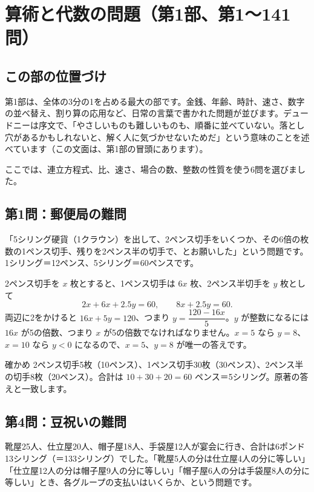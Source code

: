 \documentclass[a4paper,11pt,openany]{ltjsbook}
\begin{document}
\chapter{算術と代数の問題（第1部、第1〜141問）}

\section{この部の位置づけ}

第1部は、全体の3分の1を占める最大の部です。金銭、年齢、時計、速さ、数字の並べ替え、割り算の応用など、日常の言葉で書かれた問題が並びます。デュードニーは序文で、「やさしいものも難しいものも、順番に並べていない。落とし穴があるかもしれないと、解く人に気づかせないためだ」という意味のことを述べています（この文面は、第1部の冒頭にあります）。

ここでは、連立方程式、比、速さ、場合の数、整数の性質を使う6問を選びました。

\section{第1問：郵便局の難問}

「5シリング硬貨（1クラウン）を出して、2ペンス切手をいくつか、その6倍の枚数の1ペンス切手、残りを2ペンス半の切手で、とお願いした」という問題です。1シリング＝12ペンス、5シリング＝60ペンスです。

2ペンス切手を $x$ 枚とすると、1ペンス切手は $6x$ 枚、2ペンス半切手を $y$ 枚として
\[
2x+6x+2.5y=60,\qquad 8x+2.5y=60 .
\]
両辺に2をかけると $16x+5y=120$、つまり $y=\dfrac{120-16x}{5}$。$y$ が整数になるには $16x$ が5の倍数、つまり $x$ が5の倍数でなければなりません。$x=5$ なら $y=8$、$x=10$ なら $y<0$ になるので、$x=5$、$y=8$ が唯一の答えです。

\begin{examplebox}{確かめ}
2ペンス切手5枚（10ペンス）、1ペンス切手30枚（30ペンス）、2ペンス半の切手8枚（20ペンス）。合計は $10+30+20=60$ ペンス＝5シリング。原著の答えと一致します。
\end{examplebox}

\section{第4問：豆祝いの難問}

靴屋25人、仕立屋20人、帽子屋18人、手袋屋12人が宴会に行き、合計は6ポンド13シリング（＝133シリング）でした。「靴屋5人の分は仕立屋4人の分に等しい」「仕立屋12人の分は帽子屋9人の分に等しい」「帽子屋6人の分は手袋屋8人の分に等しい」とき、各グループの支払いはいくらか、という問題です。
\end{document}
